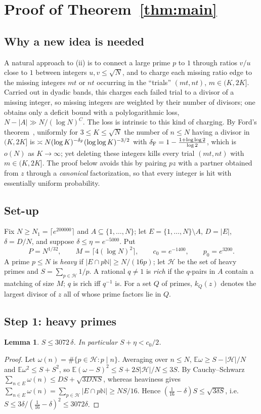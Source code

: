 \documentclass[11pt]{amsart}
\newtheorem{lemma}[theorem]{Lemma}
\theoremstyle{definition}
\theoremstyle{remark}
\newcommand{\N}{\mathbb{N}}
\newcommand{\E}{\mathbb{E}}
\newcommand{\abs}[1]{\lvert #1\rvert}
\newcommand{\ceil}[1]{\lceil #1\rceil}
\newcommand{\cH}{\mathcal{H}}
\begin{document}
\section{Proof of Theorem~\ref{thm:main}}\label{sec:main}

\subsection{Why a new idea is needed}
A natural approach to (ii) is to connect a large prime $p$ to $1$ through ratios $v/u$ close to $1$ between integers $u,v\le\sqrt N$, and to charge each missing ratio edge to the missing integers $mt$ or $nt$ occurring in the ``trials'' $(mt,nt)$, $m\in(K,2K]$. Carried out in dyadic bands, this charges each failed trial to a divisor of a missing integer, so missing integers are weighted by their number of divisors; one obtains only a deficit bound with a polylogarithmic loss, $N-\abs A\gg N/(\log N)^{C}$. The loss is intrinsic to this kind of charging. By Ford's theorem~\cite[Thm.~1]{Ford08}, uniformly for $3\le K\le\sqrt N$ the number of $n\le N$ having a divisor in $(K,2K]$ is $\asymp N(\log K)^{-\delta_{\rm F}}(\log\log K)^{-3/2}$ with $\delta_{\rm F}=1-\frac{1+\log\log2}{\log2}$, which is $o(N)$ as $K\to\infty$; yet deleting these integers kills every trial $(mt,nt)$ with $m\in(K,2K]$. The proof below avoids this by pairing $pz$ with a partner obtained from $z$ through a \emph{canonical} factorization, so that every integer is hit with essentially uniform probability.

\subsection{Set-up}
Fix $N\ge N_1=\ceil{e^{200000}}$ and $A\subseteq\{1,\dots,N\}$; let $E=\{1,\dots,N\}\setminus A$, $D=\abs E$, $\delta=D/N$, and suppose $\delta\le\eta=e^{-5000}$. Put
\[
P=N^{1/32},\qquad M=\ceil{4(\log N)^2},\qquad c_0=e^{-1400},\qquad p_0=e^{3200}.
\]
A prime $p\le N$ is \emph{heavy} if $\abs{E\cap p\N}\ge N/(16p)$; let $\cH$ be the set of heavy primes and $S=\sum_{p\in\cH}1/p$. A rational $q\ne1$ is \emph{rich} if the $q$-pairs in $A$ contain a matching of size $M$; $q$ is rich iff $q^{-1}$ is. For a set $Q$ of primes, $k_Q(z)$ denotes the largest divisor of $z$ all of whose prime factors lie in $Q$.

\subsection{Step 1: heavy primes}
\begin{lemma}\label{lem:heavy}
$S\le3072\,\delta$. In particular $S+\eta<c_0/2$.
\end{lemma}
\begin{proof}
Let $\omega(n)=\#\{p\in\cH:p\mid n\}$. Averaging over $n\le N$, $\E\omega\ge S-\abs\cH/N$ and $\E\omega^2\le S+S^2$, so $\E(\omega-S)^2\le S+2S\abs{\cH}/N\le3S$. By Cauchy--Schwarz $\sum_{n\in E}\omega(n)\le DS+\sqrt{3DNS}$, whereas heaviness gives $\sum_{n\in E}\omega(n)=\sum_{p\in\cH}\abs{E\cap p\N}\ge NS/16$. Hence $(\frac1{16}-\delta)S\le\sqrt{3\delta S}$, i.e.\ $S\le3\delta/(\frac1{16}-\delta)^2\le3072\delta$.
\end{proof}
\end{document}
